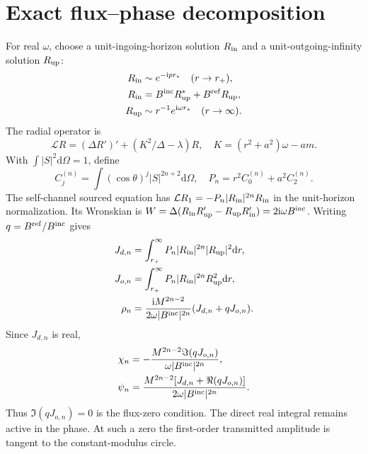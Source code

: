 \documentclass[aps,prd,twocolumn,10pt,nofootinbib,superscriptaddress,floatfix]{revtex4-2}
\newcommand{\ii}{\mathrm{i}}
\newcommand{\dd}{\mathrm{d}}
\begin{document}
\section{Exact flux--phase decomposition}
For real $\omega$, choose a unit-ingoing-horizon solution $R_{\rm in}$
and a unit-outgoing-infinity solution $R_{\rm up}$:
\begin{align}
R_{\rm in}&\sim e^{-\ii p r_*}\quad(r\to r_+),\\
R_{\rm in}&=B^{\rm inc}R_{\rm up}^*+B^{\rm ref}R_{\rm up},\\
R_{\rm up}&\sim r^{-1}e^{\ii\omega r_*}\quad(r\to\infty).
\end{align}
The radial operator is
\begin{equation}
\mathcal L R=(\Delta R')'+(K^2/\Delta-\lambda)R,
\quad K=(r^2+a^2)\omega-am.
\end{equation}
With $\int |S|^2\dd\Omega=1$, define
\begin{equation}
C_j^{(n)}=\int (\cos\theta)^j|S|^{2n+2}\dd\Omega,\quad
P_n=r^2C_0^{(n)}+a^2 C_2^{(n)}.
\end{equation}
The self-channel sourced equation has
$\mathcal L R_1=-P_n|R_{\rm in}|^{2n}R_{\rm in}$ in the
unit-horizon normalization. Its Wronskian is
$W=\Delta(R_{\rm in}R_{\rm up}'-R_{\rm up}R_{\rm in}')
=2\ii\omega B^{\rm inc}$.
Writing $q=B^{\rm ref}/B^{\rm inc}$ gives
\begin{align}
J_{d,n}&=\int_{r_+}^{\infty}P_n|R_{\rm in}|^{2n}|R_{\rm up}|^2\dd r,
\\
J_{o,n}&=\int_{r_+}^{\infty}P_n|R_{\rm in}|^{2n}R_{\rm up}^2\dd r,
\\
\rho_n&=\frac{\ii M^{2n-2}}{2\omega|B^{\rm inc}|^{2n}}
(J_{d,n}+qJ_{o,n}).
\end{align}
Since $J_{d,n}$ is real,
\begin{align}
\chi_n&=-\frac{M^{2n-2}\Im(qJ_{o,n})}{\omega|B^{\rm inc}|^{2n}},\\
\psi_n&=\frac{M^{2n-2}[J_{d,n}+\Re(qJ_{o,n})]}
{2\omega|B^{\rm inc}|^{2n}}.
\end{align}
Thus $\Im(qJ_{o,n})=0$ is the flux-zero condition. The direct real
integral remains active in the phase. At such a zero the first-order
transmitted amplitude is tangent to the constant-modulus circle.
\end{document}
